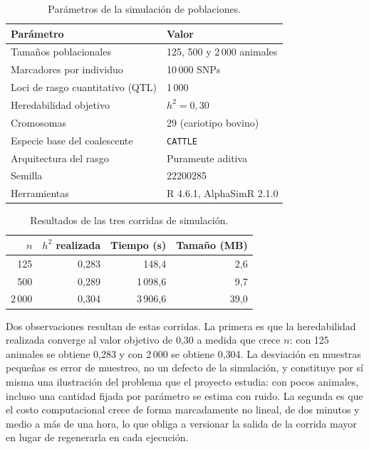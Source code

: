 \documentclass[conference]{IEEEtran}
\begin{document}
\begin{table}[!t]
\centering
\caption{Parámetros de la simulación de poblaciones.}
\label{tab:params-sim}
\renewcommand{\arraystretch}{1.2}
\footnotesize
\begin{tabular}{@{}ll@{}}
\toprule
\textbf{Parámetro} & \textbf{Valor} \\
\midrule
Tamaños poblacionales & 125, 500 y 2\,000 animales \\
Marcadores por individuo & 10\,000 SNPs \\
Loci de rasgo cuantitativo (QTL) & 1\,000 \\
Heredabilidad objetivo & $h^2 = 0{,}30$ \\
Cromosomas & 29 (cariotipo bovino) \\
Especie base del coalescente & \texttt{CATTLE} \\
Arquitectura del rasgo & Puramente aditiva \\
Semilla & 22200285 \\
Herramientas & R 4.6.1, AlphaSimR 2.1.0 \\
\bottomrule
\end{tabular}
\end{table}

\begin{table}[!t]
\centering
\caption{Resultados de las tres corridas de simulación.}
\label{tab:res-sim}
\renewcommand{\arraystretch}{1.2}
\footnotesize
\begin{tabular}{@{}rrrr@{}}
\toprule
\textbf{$n$} & \textbf{$h^2$ realizada} & \textbf{Tiempo (s)} &
\textbf{Tamaño (MB)} \\
\midrule
125   & 0{,}283 & 148{,}4  & 2{,}6 \\
500   & 0{,}289 & 1\,098{,}6 & 9{,}7 \\
2\,000 & 0{,}304 & 3\,906{,}6 & 39{,}0 \\
\bottomrule
\end{tabular}
\end{table}

Dos observaciones resultan de estas corridas. La primera es que la
heredabilidad realizada converge al valor objetivo de 0{,}30 a medida que
crece $n$: con 125 animales se obtiene 0{,}283 y con 2\,000 se obtiene
0{,}304. La desviación en muestras pequeñas es error de muestreo, no un
defecto de la simulación, y constituye por sí misma una ilustración del
problema que el proyecto estudia: con pocos animales, incluso una cantidad
fijada por parámetro se estima con ruido. La segunda es que el costo
computacional crece de forma marcadamente no lineal, de dos minutos y
medio a más de una hora, lo que obliga a versionar la salida de la corrida
mayor en lugar de regenerarla en cada ejecución.
\end{document}
